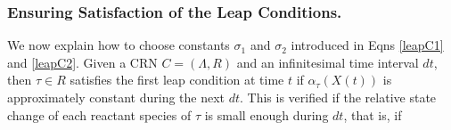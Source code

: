 \documentclass{llncs}
\begin{document}
\subsubsection{Ensuring Satisfaction of the Leap Conditions.}\label{Thresholds}%


We now explain how to choose constants $\sigma_1$ and $\sigma_2$ introduced in Eqns \eqref{leapC1} and \eqref{leapC2}. %
Given a CRN $C=(\Lambda,R)$ and an infinitesimal time interval $dt$, then $\tau \in R$ satisfies the first leap condition at time $t$ if $\alpha_{\tau}(X(t))$ is approximately constant during the next $dt$. This is verified if the relative state change of each reactant species of $\tau$ is small enough during $dt$, that is, if
\end{document}
